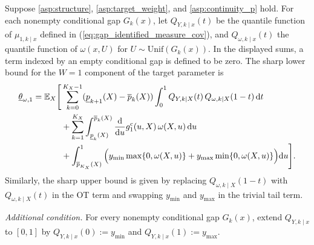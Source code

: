 \begin{theorem}\label{thm:covariate_continuous_lower_bound}
    Suppose \cref{asp:structure}, \cref{asp:target_weight}, and \cref{asp:continuity_p} hold. For each nonempty conditional gap $G_k(x)$, let $Q_{Y, k \mid x}(t)$ be the quantile function of $\mu_{1,k\mid x}$ defined in (\ref{eq:gap_identified_measure_cov}), and $Q_{\omega, k \mid x}(t)$ the quantile function of $\omega(x, U)$ for $U \sim \text{Unif}(G_k(x))$. In the displayed sums, a term indexed by an empty conditional gap is defined to be zero. The sharp lower bound for the $W=1$ component of the target parameter is
    \begin{equation} \label{eq:covariate_continuous_lower_bound}
        \begin{split}
        \underline{\theta}_{\omega,1}  = \mathbb{E}_{X} \Bigg[ & \sum_{k=0}^{K_X-1}(\underline{p}_{k+1}(X)-\overline{p}_k(X))\int_0^1 Q_{Y,k\mid X}(t)\,Q_{\omega,k\mid X}(1-t)\,\mathrm{d}t \\
        & + \sum_{k=1}^{K_X}\int_{\underline{p}_k(X)}^{\overline{p}_k(X)} \frac{{\rm d}}{{\rm d} u}g_1^{\mathrm c}(u,X)\, \omega(X, u) \, \mathrm{d}u \\
        & + \int_{\overline{p}_{K_X}(X)}^1 \Big( y_{\min} \max\{0, \omega(X, u)\} + y_{\max} \min\{0, \omega(X, u)\} \Big) \mathrm{d}u \Bigg].
        \end{split}
    \end{equation}
    Similarly, the sharp upper bound is given by replacing $Q_{\omega,k\mid X}(1-t)$ with $Q_{\omega,k\mid X}(t)$ in the OT term and swapping $y_{\min}$ and $y_{\max}$ in the trivial tail term.

\emph{Additional condition.} For every nonempty conditional gap $G_k(x)$, extend $Q_{Y,k\mid x}$ to $[0,1]$ by $Q_{Y,k\mid x}(0):=y_{\min}$ and $Q_{Y,k\mid x}(1):=y_{\max}$.
\end{theorem}


